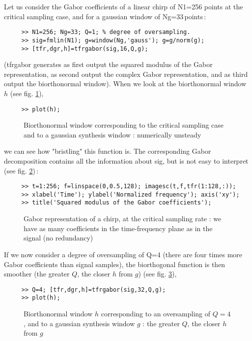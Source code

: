  Let us consider the Gabor coefficients of a linear chirp of N1=256 points
at the critical sampling case, and for a gaussian window of
Ng=33\,points\,:
\begin{verbatim}
     >> N1=256; Ng=33; Q=1; % degree of oversampling.
     >> sig=fmlin(N1); g=window(Ng,'gauss'); g=g/norm(g);
     >> [tfr,dgr,h]=tfrgabor(sig,16,Q,g);
\end{verbatim}
({\ttfamily tfrgabor} generates as first output the squared modulus of the
Gabor representation, as second output the complex Gabor representation,
and as third output the biorthonormal window). When we look at the
biorthonormal window $h$ (see fig. \ref{At3fig1}),
\begin{verbatim}
     >> plot(h); 
\end{verbatim}
\begin{figure}[htb]
\epsfxsize=10cm
\epsfysize=6cm
\centerline{}
\caption{\label{At3fig1}Biorthonormal window corresponding to the critical
sampling case and to a gaussian synthesis window : numerically unsteady}
\end{figure}
we can see how "bristling" this function is. The corresponding Gabor
decomposition contains all the information about {\ttfamily sig}, but is
not easy to interpret (see fig. \ref{At3fig2})\,:
\begin{verbatim}
     >> t=1:256; f=linspace(0,0.5,128); imagesc(t,f,tfr(1:128,:)); 
     >> xlabel('Time'); ylabel('Normalized frequency'); axis('xy'); 
     >> title('Squared modulus of the Gabor coefficients');
\end{verbatim}
\begin{figure}[htb]
\epsfxsize=10cm
\epsfysize=8cm
\centerline{}
\caption{\label{At3fig2}Gabor representation of a chirp, at the critical
sampling rate : we have as many coefficients in the time-frequency plane as
in the signal (no redundancy)}
\end{figure}
If we now consider a degree of oversampling of {\ttfamily Q=4} (there are
four times more Gabor coefficients than signal samples), the biorthogonal
function is then smoother (the greater $Q$, the closer $h$ from $g$) (see
fig. \ref{At3fig3}), 
\begin{verbatim}
     >> Q=4; [tfr,dgr,h]=tfrgabor(sig,32,Q,g);
     >> plot(h);
\end{verbatim}
\begin{figure}[htb]
\epsfxsize=10cm
\epsfysize=6cm
\centerline{}
\caption{\label{At3fig3}Biorthonormal window $h$ corresponding to an
oversampling of $Q=4$, and to a gaussian synthesis window $g$ : the greater
$Q$, the closer $h$ from $g$}
\end{figure}

